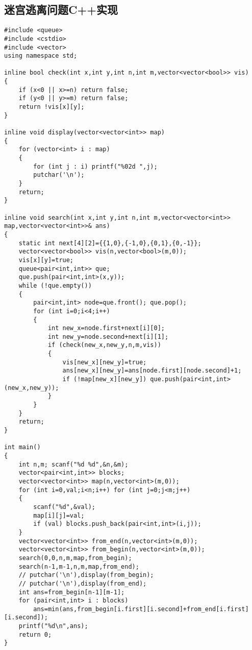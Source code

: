 \documentclass{article}
\begin{document}
\subsection{迷宫逃离问题C++实现}

\begin{lstlisting}
#include <queue>
#include <cstdio>
#include <vector>
using namespace std;

inline bool check(int x,int y,int n,int m,vector<vector<bool>> vis)
{
    if (x<0 || x>=n) return false;
    if (y<0 || y>=m) return false;
    return !vis[x][y];
}

inline void display(vector<vector<int>> map)
{
    for (vector<int> i : map)
    {
        for (int j : i) printf("%02d ",j);
        putchar('\n');
    }
    return;
}

inline void search(int x,int y,int n,int m,vector<vector<int>> map,vector<vector<int>>& ans)
{
    static int next[4][2]={{1,0},{-1,0},{0,1},{0,-1}};
    vector<vector<bool>> vis(n,vector<bool>(m,0));
    vis[x][y]=true;
    queue<pair<int,int>> que;
    que.push(pair<int,int>(x,y));
    while (!que.empty())
    {
        pair<int,int> node=que.front(); que.pop();
        for (int i=0;i<4;i++)
        {
            int new_x=node.first+next[i][0];
            int new_y=node.second+next[i][1];
            if (check(new_x,new_y,n,m,vis))
            {
                vis[new_x][new_y]=true;
                ans[new_x][new_y]=ans[node.first][node.second]+1;
                if (!map[new_x][new_y]) que.push(pair<int,int>(new_x,new_y));
            }
        }
    }
    return;
}

int main()
{
    int n,m; scanf("%d %d",&n,&m);
    vector<pair<int,int>> blocks;
    vector<vector<int>> map(n,vector<int>(m,0));
    for (int i=0,val;i<n;i++) for (int j=0;j<m;j++)
    {
        scanf("%d",&val);
        map[i][j]=val;
        if (val) blocks.push_back(pair<int,int>(i,j));
    }
    vector<vector<int>> from_end(n,vector<int>(m,0));
    vector<vector<int>> from_begin(n,vector<int>(m,0));
    search(0,0,n,m,map,from_begin);
    search(n-1,m-1,n,m,map,from_end);
    // putchar('\n'),display(from_begin);
    // putchar('\n'),display(from_end);
    int ans=from_begin[n-1][m-1];
    for (pair<int,int> i : blocks)
        ans=min(ans,from_begin[i.first][i.second]+from_end[i.first][i.second]);
    printf("%d\n",ans);
    return 0;
}
\end{lstlisting}
\end{document}
